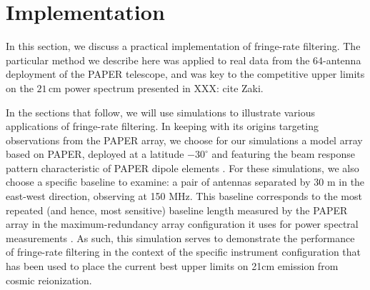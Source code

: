 \documentclass[twocolumn,apj,numberedappendix]{emulateapj}
\begin{document}

\section{Implementation}

In this section, we discuss a practical implementation of fringe-rate filtering. The particular method we describe here was applied to real data from the 64-antenna deployment of the PAPER telescope, and was key to the competitive upper limits on the $21\,\textrm{cm}$ power spectrum presented in XXX: cite Zaki.

In the sections that follow, we will use simulations to illustrate various applications of fringe-rate filtering.  In keeping with its origins targeting observations from the
PAPER array, we choose for our simulations a model array based on PAPER, deployed at a latitude $-30^\circ$
and featuring the beam response pattern characteristic of PAPER dipole elements \citep{parsons_et_al2008,pober_et_al2012}.
For these simulations, we also choose a specific baseline to examine: a pair of antennas separated by 30 m in the 
east-west direction, observing at 150 MHz.  This baseline corresponds to the most repeated (and hence,
most sensitive) baseline length measured by the PAPER array in the maximum-redundancy array configuration it uses
for power spectral measurements \citep{parsons_et_al2012a,parsons_et_al2014,ali_et_al2015}.  As such, this simulation
serves to demonstrate the performance of fringe-rate filtering in the context of the specific instrument configuration
that has been used to place the current best upper limits on 21cm emission from cosmic reionization.
\end{document}
